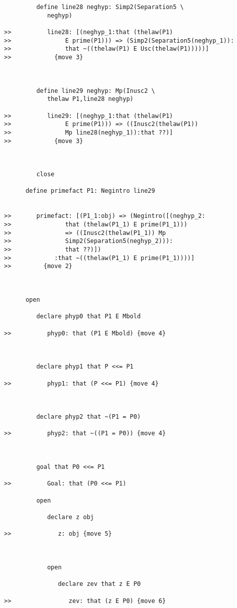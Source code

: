 \documentclass[12pt]{article}
\begin{document}
\begin{verbatim}
         define line28 neghyp: Simp2(Separation5 \
            neghyp)

>>          line28: [(neghyp_1:that (thelaw(P1)
>>               E prime(P1))) => (Simp2(Separation5(neghyp_1)):
>>               that ~((thelaw(P1) E Usc(thelaw(P1)))))]
>>            {move 3}



         define line29 neghyp: Mp(Inusc2 \
            thelaw P1,line28 neghyp)

>>          line29: [(neghyp_1:that (thelaw(P1)
>>               E prime(P1))) => ((Inusc2(thelaw(P1))
>>               Mp line28(neghyp_1)):that ??)]
>>            {move 3}



         close

      define primefact P1: Negintro line29


>>       primefact: [(P1_1:obj) => (Negintro([(neghyp_2:
>>               that (thelaw(P1_1) E prime(P1_1)))
>>               => ((Inusc2(thelaw(P1_1)) Mp
>>               Simp2(Separation5(neghyp_2))):
>>               that ??)])
>>            :that ~((thelaw(P1_1) E prime(P1_1))))]
>>         {move 2}



      open

         declare phyp0 that P1 E Mbold

>>          phyp0: that (P1 E Mbold) {move 4}



         declare phyp1 that P <<= P1

>>          phyp1: that (P <<= P1) {move 4}



         declare phyp2 that ~(P1 = P0)

>>          phyp2: that ~((P1 = P0)) {move 4}



         goal that P0 <<= P1

>>          Goal: that (P0 <<= P1)

         open

            declare z obj

>>             z: obj {move 5}



            open

               declare zev that z E P0

>>                zev: that (z E P0) {move 6}




\end{verbatim}
\end{document}

